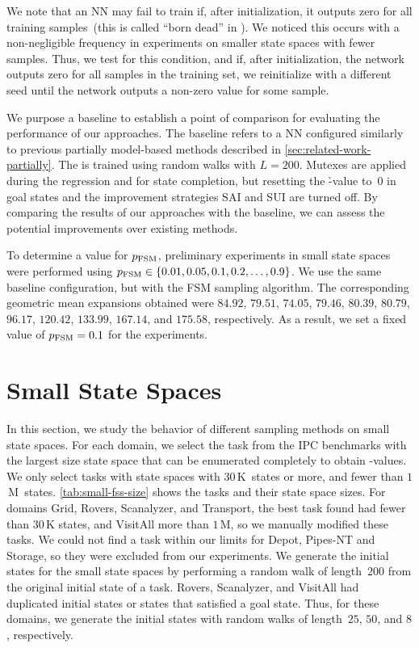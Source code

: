 We note that an NN may fail to train if, after initialization, it outputs zero for all training samples~(this is called ``born dead'' in \citet{lu2020dying}). We noticed this occurs with a non-negligible frequency in experiments on smaller state spaces with fewer samples. Thus, we test for this condition, and if, after initialization, the network outputs zero for all samples in the training set, we reinitialize with a different seed until the network outputs a non-zero value for some sample.

We purpose a baseline \hnnbase to establish a point of comparison for evaluating the performance of our approaches. The baseline refers to a NN configured similarly to previous partially model-based methods described in \cref{sec:related-work-partially}. The \hnnbase is trained using random walks with $L=200$. Mutexes are applied during the regression and for state completion, but resetting the \h-value to~$0$ in goal states and the improvement strategies SAI and SUI are turned off. By comparing the results of our approaches with the baseline, we can assess the potential improvements over existing methods.

To determine a value for $p_{\text{FSM}}$, preliminary experiments in small state spaces were performed using $p_{\text{FSM}}\in\{0.01,0.05,0.1,0.2,\ldots,0.9\}$. We use the same baseline configuration, but with the FSM sampling algorithm. The corresponding geometric mean expansions obtained were $84.92$, $79.51$, $74.05$, $79.46$, $80.39$, $80.79$, $96.17$, $120.42$, $133.99$, $167.14$, and $175.58$, respectively. As a result, we set a fixed value of $p_{\text{FSM}} = 0.1$ for the experiments.

\section{Small State Spaces}
\label{sec:small-experiments}

In this section, we study the behavior of different sampling methods on small state spaces. For each domain, we select the task from the IPC benchmarks with the largest size state space that can be enumerated completely to obtain \hstar-values. We only select tasks with state spaces with $30$\,K~states or more, and fewer than $1$\,M~states. \cref{tab:small-fss-size} shows the tasks and their state space sizes. For domains Grid, Rovers, Scanalyzer, and Transport, the best task found had fewer than $30$\,K states, and VisitAll more than $1$\,M, so we manually modified these tasks. We could not find a task within our limits for Depot, Pipes-NT and Storage, so they were excluded from our experiments. We generate the initial states for the small state spaces by performing a random walk of length~$200$ from the original initial state of a task. Rovers, Scanalyzer, and VisitAll had duplicated initial states or states that satisfied a goal state. Thus, for these domains, we generate the initial states with random walks of length~$25$, $50$, and $8$, respectively.

